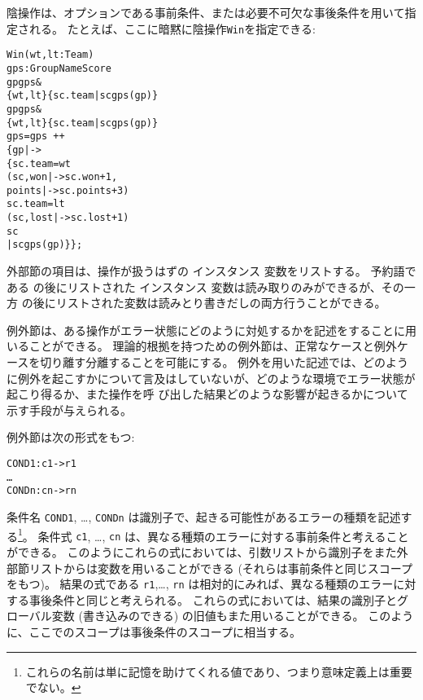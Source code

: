 \documentclass[\pformat,12pt]{jarticle}
\begin{document}
\begin{description}
陰操作は、オプションである事前条件、または必要不可欠な事後条件を用いて指定される。
たとえば、ここに暗黙に陰操作\texttt{Win}を指定できる:
\begin{alltt}
  Win (wt,lt: Team)
   gps :  GroupName  Score
    gp  gps & 
          \{wt,lt\}  \{sc.team | sc  gps(gp)\}
    gp  gps &
         \{wt,lt\}  \{sc.team | sc  gps(gp)\}
          gps = gps~ ++ 
                       \{ gp |-> 
                         \{ sc.team = wt
                           (sc, won |-> sc.won + 1,
                                     points |-> sc.points + 3)
                           sc.team = lt
                          (sc, lost |-> sc.lost + 1)
                           sc 
                     | sc  gps(gp)\}\};
\end{alltt}

外部節の項目は、操作が扱うはずの
インスタンス
変数をリストする。
予約語である  の後にリストされた
インスタンス
変数は読み取りのみができるが、その一方 の後にリストされた変数は読みとり書きだしの両方行うことができる。
 

例外節は、ある操作がエラー状態にどのように対処するかを記述をすることに用いることができる。
理論的根拠を持つための例外節は、正常なケースと例外ケースを切り離す分離することを可能にする。
例外を用いた記述では、どのように例外を起こすかについて言及はしていないが、どのような環境でエラー状態が起こり得るか、また操作を呼
び出した結果どのような影響が起きるかについて示す手段が与えられる。

例外節は次の形式をもつ:
\begin{alltt}
    COND1: c1 -> r1
       \ldots
       CONDn: cn -> rn
\end{alltt}
条件名 {\tt COND1}, \ldots, {\tt CONDn} は識別子で、起きる可能性があるエラーの種類を記述する\footnote{これらの名前は単に記憶を助けてくれる値であり、つまり意味定義上は重要でない。}。 
条件式 {\tt c1}, \ldots, {\tt cn} は、異なる種類のエラーに対する事前条件と考えることができる。
このようにこれらの式においては、引数リストから識別子をまた外部節リストからは変数を用いることができる (それらは事前条件と同じスコープをもつ)。
結果の式である {\tt r1},\ldots, {\tt rn} は相対的にみれば、異なる種類のエラーに対する事後条件と同じと考えられる。
これらの式においては、結果の識別子とグローバル変数 (書き込みのできる) の旧値もまた用いることができる。
このように、ここでのスコープは事後条件のスコープに相当する。


\end{description}
\end{document}
